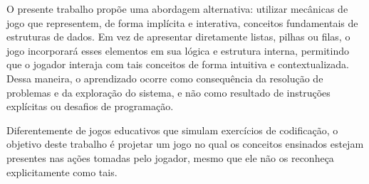 O presente trabalho propõe uma abordagem alternativa: utilizar mecânicas de
jogo que representem, de forma implícita e interativa, conceitos fundamentais
de estruturas de dados. Em vez de apresentar diretamente listas, pilhas ou
filas, o jogo incorporará esses elementos em sua lógica e estrutura interna,
permitindo que o jogador interaja com tais conceitos de forma intuitiva e
contextualizada. Dessa maneira, o aprendizado ocorre como consequência da
resolução de problemas e da exploração do sistema, e não como resultado de
instruções explícitas ou desafios de programação.

Diferentemente de jogos educativos que simulam exercícios de codificação, o
objetivo deste trabalho é projetar um jogo no qual os conceitos ensinados
estejam presentes nas ações tomadas pelo jogador, mesmo que ele não os
reconheça explicitamente como tais.
